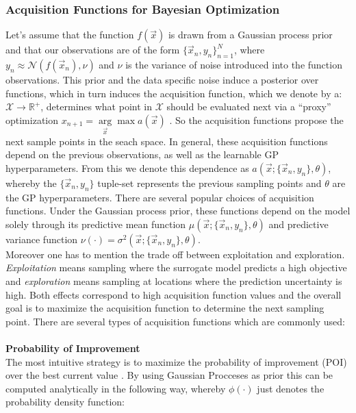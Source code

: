 \documentclass[12pt, a4paper]{article}
\begin{document}
\subsubsection{Acquisition Functions for Bayesian Optimization}
Let's assume that the function $f(\vec{x})$ is drawn from a Gaussian process prior and that our observations are of the form $\{\vec{x}_n,y_n\}_{n=1}^N$, where $y_n \approx \mathcal{N}(f(\vec{x}_n),\nu)$ and $\nu$ is the variance of noise introduced into the function observations.
This prior and the data specific noise induce a posterior over functions, which in turn induces the acquisition function, which we denote by a: $\mathcal{X} \rightarrow \mathbb{R}^{+}$, determines what point in $\mathcal{X}$ should be evaluated next via a ``proxy'' optimization $x_{n+1} = \underset{\vec{x}}\arg\max a(\vec{x})$ \cite{Snoek2012}. So the acquisition functions propose the next sample points in the seach space. In general, these acquisition functions depend on the previous observations, as well as the learnable GP hyperparameters. From this we denote this dependence as $a(\vec{x};\{\vec{x}_n,y_n\},\theta)$, whereby the $\{\vec{x}_n,y_n\}$ tuple-set represents the previous sampling points and $\theta$ are the GP hyperparameters.
There are several popular choices of acquisition functions. Under the Gaussian process prior, these functions depend on the model solely through its predictive mean function $\mu(\vec{x};\{\vec{x}_n,y_n\},\theta)$ and predictive variance function $\nu(\cdot) = \sigma^2(\vec{x};\{\vec{x}_n, y_n\}, \theta)$.\\
Moreover one has to mention the trade off between exploitation and exploration.\\
\textit{Exploitation} means sampling where the surrogate model predicts a high objective and \textit{exploration} means sampling at locations where the prediction uncertainty is high. Both effects correspond to high acquisition function values and the overall goal is to maximize the acquisition function to determine the next sampling point. There are several types of acquisition functions which are commonly used: \\
\\
\textbf{Probability of Improvement} \\
The most intuitive strategy is to maximize the probability of improvement (POI) over the best current value \cite{Kushner1964}. By using Gaussian Procceses as prior this can be computed analytically in the following way, whereby $\phi(\cdot)$ just denotes the probability density function:
\end{document}
